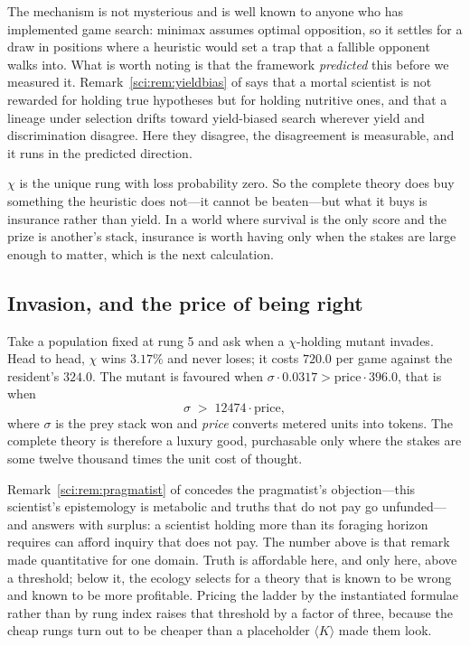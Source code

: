 The mechanism is not mysterious and is well known to anyone who has implemented
game search: minimax assumes optimal opposition, so it settles for a draw in
positions where a heuristic would set a trap that a fallible opponent walks
into. What is worth noting is that the framework \emph{predicted} this before we
measured it. Remark~\ref{sci:rem:yieldbias} of \chSci says that a mortal scientist is not
rewarded for holding true hypotheses but for holding nutritive ones, and that a
lineage under selection drifts toward yield-biased search wherever yield and
discrimination disagree. Here they disagree, the disagreement is measurable, and
it runs in the predicted direction.

\begin{corollary}\label{gam:truth-buys-safety-food}
$\chi$ is the unique rung with loss probability zero. So the complete theory
does buy something the heuristic does not---it cannot be beaten---but what it
buys is insurance rather than yield. In a world where survival is the only score
and the prize is another's stack, insurance is worth having only when the stakes
are large enough to matter, which is the next calculation.
\end{corollary}

\subsection{Invasion, and the price of being right}\label{gam:S8.2}

Take a population fixed at rung 5 and ask when a $\chi$-holding mutant invades.
Head to head, $\chi$ wins $3.17\%$ and never loses; it costs $720.0$ per game
against the resident's $324.0$. The mutant is favoured when $\sigma \cdot
0.0317 > \text{price} \cdot 396.0$, that is when
\[
\sigma \;>\; 12474 \cdot \text{price},
\]
where $\sigma$ is the prey stack won and \emph{price} converts metered units
into tokens. The complete theory is therefore a luxury good, purchasable only
where the stakes are some twelve thousand times the unit cost of thought.

\begin{remark}\label{gam:basic-research-priced}
Remark~\ref{sci:rem:pragmatist} of \chSci concedes the pragmatist's objection---this
scientist's epistemology is metabolic and truths that do not pay go
unfunded---and answers with surplus: a scientist holding more than its foraging
horizon requires can afford inquiry that does not pay. The number above is that
remark made quantitative for one domain. Truth is affordable here, and only
here, above a threshold; below it, the ecology selects for a theory that is
known to be wrong and known to be more profitable. Pricing the ladder by the
instantiated formulae rather than by rung index raises that threshold by a
factor of three, because the cheap rungs turn out to be cheaper than a
placeholder $\langle K\rangle$ made them look.
\end{remark}

